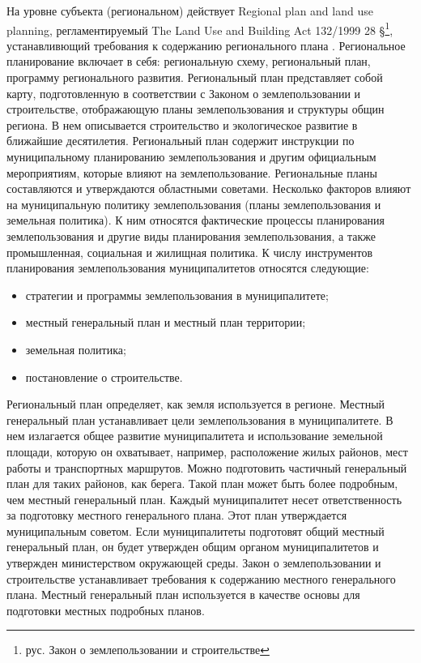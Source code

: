 На уровне субъекта (региональном) действует Regional plan and land use planning, регламентируемый The Land Use and Building Act 132/1999 28 §\footnote{рус. Закон о землепользовании и строительстве},
устанавливющий требования к содержанию регионального плана \cite{law_FIN_RulesCode_LanduseAndBuilding}.
Региональное планирование включает в себя: региональную схему, региональный план, программу регионального развития.
Региональный план представляет собой карту, подготовленную в соответствии с Законом о землепользовании и строительстве, отображающую планы землепользования и структуры общин региона.
В нем описывается строительство и экологическое развитие в ближайшие десятилетия. Региональный план содержит инструкции по муниципальному планированию землепользования и другим официальным мероприятиям, которые влияют на землепользование.
Региональные планы составляются и утверждаются областными советами.
Несколько факторов влияют на муниципальную политику землепользования (планы землепользования и земельная политика).
К ним относятся фактические процессы планирования землепользования и другие виды планирования землепользования, а также промышленная, социальная и жилищная политика.
К числу инструментов планирования землепользования муниципалитетов относятся следующие:
\begin{itemize}
    \item стратегии и программы землепользования в муниципалитете;
    \item местный генеральный план и местный план территории;
    \item земельная политика;
    \item постановление о строительстве.
\end{itemize}
Региональный план определяет, как земля используется в регионе. Местный генеральный план устанавливает цели землепользования в муниципалитете.
В нем излагается общее развитие муниципалитета и использование земельной площади, которую он охватывает, например, расположение жилых районов, мест работы и транспортных маршрутов.
Можно подготовить частичный генеральный план для таких районов, как берега. Такой план может быть более подробным, чем местный генеральный план.
Каждый муниципалитет несет ответственность за подготовку местного генерального плана.
Этот план утверждается муниципальным советом. Если муниципалитеты подготовят общий местный генеральный план, он будет утвержден общим органом муниципалитетов и утвержден министерством окружающей среды.
Закон о землепользовании и строительстве устанавливает требования к содержанию местного генерального плана.
Местный генеральный план используется в качестве основы для подготовки местных подробных планов.


